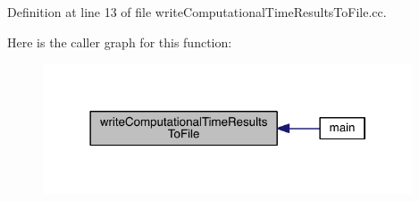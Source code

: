 Definition at line 13 of file write\+Computational\+Time\+Results\+To\+File.\+cc.



Here is the caller graph for this function\+:\nopagebreak
\begin{figure}[H]
\begin{center}
\leavevmode
\includegraphics[width=310pt]{a00116_a006b80a1f9b722b42b808c5e38565fc7_icgraph}
\end{center}
\end{figure}


